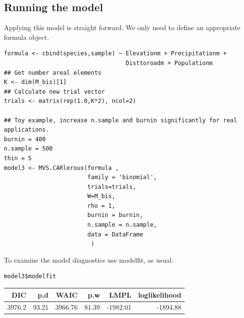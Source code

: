 \documentclass[11pt]{article}
\begin{document}
\subsection{Running the model}
\label{sec:orgbc76aec}
Applying this model is straight forward. We only need to define an appropriate formula object.

\begin{verbatim}
formula <- cbind(species,sample) ~ Elevationm + Precipitationm +
                                   Disttoroadm + Populationm
## Get number areal elements
K <- dim(M_bis)[1]
## Calculate new trial vector
trials <- matrix(rep(1.0,K*2), ncol=2)

## Toy example, increase n.sample and burnin significantly for real applications.
burnin = 400
n.sample = 500
thin = 5
model3 <- MVS.CARleroux(formula ,
                        family = 'binomial',
                        trials=trials,
                        W=M_bis,
                        rho = 1,
                        burnin = burnin,
                        n.sample = n.sample,
                        data = DataFrame
                         )

\end{verbatim}

To examine the model diagnostics use modelfit, as usual.

\begin{verbatim}
model3$modelfit
\end{verbatim}

\begin{center}
\begin{tabular}{rrrrrr}
DIC & p.d & WAIC & p.w & LMPL & loglikelihood\\
\hline
3976.2 & 93.21 & 3966.76 & 81.39 & -1982.01 & -1894.88\\
\end{tabular}
\end{center}





\end{document}
